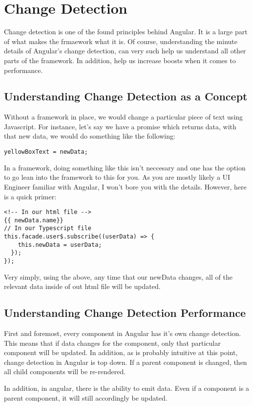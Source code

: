 \section{ Change Detection }
\maketitle{}

Change detection is one of the found principles behind Angular. It is a large
part of what makes the frmaework what it is. Of course, understanding the
minute details of Angular's change detection, can very such help us understand
all other parts of the framework. In addition, help us increase boosts when it
comes to performance.

\subsection{Understanding Change Detection as a Concept}
Without a framework in place, we would change a particular piece of text
using Javascript. For instance, let's say we have a promise which returns data,
with that new data, we would do something like the following:

\begin{lstlisting}
yellowBoxText = newData;
\end{lstlisting}

In a framework, doing something like this isn't neccesary and one has the option
to go lean into the framework to this for you. As you are mostly likely a UI
Engineer familiar with Angular, I won't bore you with the details. However, here
is a quick primer:
\begin{lstlisting}
<!-- In our html file -->
{{ newData.name}}
// In our Typescript file
this.facade.user$.subscribe((userData) => {
    this.newData = userData;
  });
});
\end{lstlisting}

Very simply, using the above, any time that our newData changes, all of the
relevant data inside of out html file will be updated.

\subsection{ Understanding Change Detection Performance }
First and foremost, every component in Angular has it's own change detection.
This means that if data changes for the component, only that particular
component will be updated. In addition, as is probably intuitive at this point,
change detection in Angular is top down. If a parent component is changed, then
all child components will be re-rendered.

In addition, in angular, there is the ability to emit data. Even if a component
is a parent component, it will still accordingly be updated.
